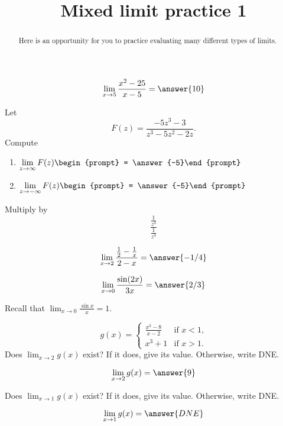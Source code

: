 \documentclass[handout]{ximera}
\title{Mixed limit practice 1}
\begin{document}
\begin{abstract}
Here is an opportunity for you to practice evaluating many different types of limits. 
\end{abstract}
\maketitle

\begin{exercise}
\[\lim_{x \to 5} \frac{x^2-25}{x-5} = \answer{10}\]
\end{exercise}

\begin{exercise}
Let 
\[
F(z) = \frac{-5 z^3-3}{z^3-5 z^2-2 z}.
\]
Compute
\begin{enumerate}
\item $\displaystyle\lim_{z\to \infty} F(z) \begin{prompt} = \answer{-5}\end{prompt}$
\item $\displaystyle\lim_{z\to -\infty}F(z) \begin{prompt} = \answer{-5}\end{prompt}$
\end{enumerate}
\begin{hint}
Multiply by
\[
\frac{\frac{1}{z^3}}{\frac{1}{z^3}}
\]
\end{hint}
\end{exercise}

\begin{exercise}
\[\lim_{x \to 2} \frac{\frac{1}{2}-\frac{1}{x}}{2-x} = \answer{-1/4}\]
\end{exercise}

\begin{exercise}
\[\lim_{x \to 0} \frac{\sin(2x)}{3x} = \answer{2/3}\]
\begin{hint}
Recall that $\displaystyle\lim_{x \to 0} \frac{\sin x}{x} = 1$.
\end{hint}
\end{exercise}

\begin{exercise}
\[
g(x) = \begin{cases}
  \frac{x^3 - 8}{x-2}  &\text{if $x<1$,} \\
  x^3+1 &\text{if  $x>1$.}
\end{cases}
\]
Does $\lim_{x \to 2} g(x)$ exist?  If it does, give its value.
Otherwise, write DNE.

\[
\lim_{x \to 2} g(x) = \answer{9}
\]

Does $\lim_{x \to 1} g(x)$ exist?  If it does, give its value.
Otherwise, write DNE.

\[
\lim_{x \to 1} g(x) = \answer{DNE}
\]
\end{exercise}
\end{document}
